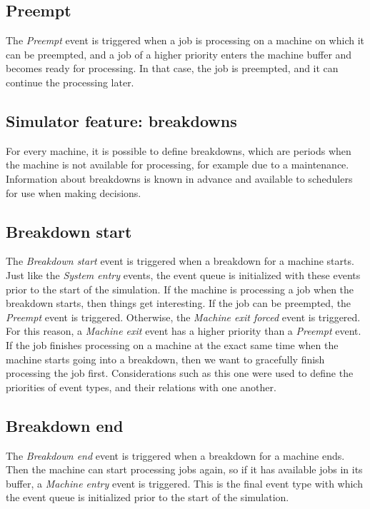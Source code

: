 \subsection{Preempt}
The \textit{Preempt} event is triggered when a job is processing on a machine on which it can be preempted, and a job of a higher priority enters the machine buffer and becomes ready for processing. In that case, the job is preempted, and it can continue the processing later.

\subsection{Simulator feature: breakdowns}
For every machine, it is possible to define breakdowns, which are periods when the machine is not available for processing, for example due to a maintenance. Information about breakdowns is known in advance and available to schedulers for use when making decisions.

\subsection{Breakdown start}
The \textit{Breakdown start} event is triggered when a breakdown for a machine starts. Just like the \textit{System entry} events, the event queue is initialized with these events prior to the start of the simulation. If the machine is processing a job when the breakdown starts, then things get interesting. If the job can be preempted, the \textit{Preempt} event is triggered. Otherwise, the \textit{Machine exit forced} event is triggered. For this reason, a \textit{Machine exit} event has a higher priority than a \textit{Preempt} event. If the job finishes processing on a machine at the exact same time when the machine starts going into a breakdown, then we want to gracefully finish processing the job first. Considerations such as this one were used to define the priorities of event types, and their relations with one another.

\subsection{Breakdown end}
The \textit{Breakdown end} event is triggered when a breakdown for a machine ends. Then the machine can start processing jobs again, so if it has available jobs in its buffer, a \textit{Machine entry} event is triggered. This is the final event type with which the event queue is initialized prior to the start of the simulation.

